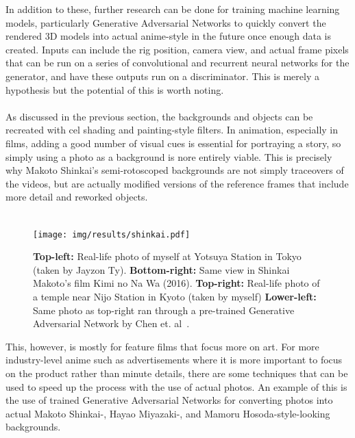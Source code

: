 In addition to these, further research can be done for training machine learning models, particularly Generative Adversarial Networks to quickly convert the rendered 3D models into actual anime-style in the future once enough data is created. Inputs can include the rig position, camera view, and actual frame pixels that can be run on a series of convolutional and recurrent neural networks for the generator, and have these outputs run on a discriminator. This is merely a hypothesis but the potential of this is worth noting.\\\\
As discussed in the previous section, the backgrounds and objects can be recreated with cel shading and painting-style filters. In animation, especially in films, adding a good number of visual cues is essential for portraying a story, so simply using a photo as a background is nore entirely viable. This is precisely why Makoto Shinkai's semi-rotoscoped backgrounds are not simply traceovers of the videos, but are actually modified versions of the reference frames that include more detail and reworked objects.\\\\

\begin{figure}[t]
    \centering
    \texttt{[image: img/results/shinkai.pdf]} \\
    \caption{\textbf{Top-left:} {{Real-life photo of myself at Yotsuya Station in Tokyo (taken by Jayzon Ty)}}. \textbf{Bottom-right:} Same view in Shinkai Makoto's film Kimi no Na Wa (2016). \textbf{Top-right:} {{Real-life photo of a temple near Nijo Station in Kyoto (taken by myself)} \textbf{Lower-left:} {{Same photo as top-right ran through a pre-trained Generative Adversarial Network by Chen et. al~\cite{cartoonGAN}}}.}}
    \vspace{-15pt}
    \label{fig:shinkai}
\end{figure}

This, however, is mostly for feature films that focus more on art. For more industry-level anime such as advertisements where it is more important to focus on the product rather than minute details, there are some techniques that can be used to speed up the process with the use of actual photos. An example of this is the use of trained Generative Adversarial Networks for converting photos into actual Makoto Shinkai-, Hayao Miyazaki-, and Mamoru Hosoda-style-looking backgrounds.\\\\

